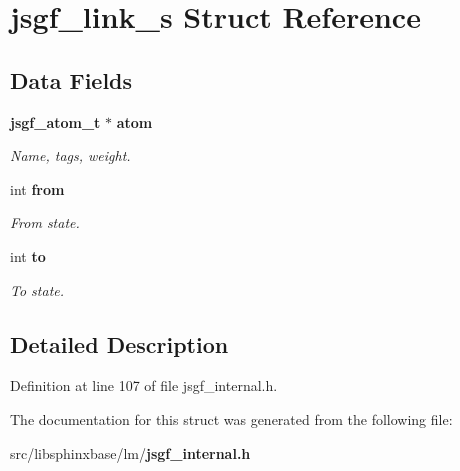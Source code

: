 \section{jsgf\-\_\-link\-\_\-s Struct Reference}
\label{structjsgf__link__s}
\subsection*{Data Fields}
\begin{DoxyCompactItemize}
\item 
{\bf jsgf\-\_\-atom\-\_\-t} $\ast$ {\bf atom}\label{structjsgf__link__s_a140a7cfbe76100928b9c7ea052435ca5}

\begin{DoxyCompactList}\small\item\em Name, tags, weight. \end{DoxyCompactList}\item 
int {\bf from}\label{structjsgf__link__s_a02f9b2bc3b98e802164e80d051923bb3}

\begin{DoxyCompactList}\small\item\em From state. \end{DoxyCompactList}\item 
int {\bf to}\label{structjsgf__link__s_a9da8ad9d87149f0cfca6ca815c581717}

\begin{DoxyCompactList}\small\item\em To state. \end{DoxyCompactList}\end{DoxyCompactItemize}


\subsection{Detailed Description}


Definition at line 107 of file jsgf\-\_\-internal.\-h.



The documentation for this struct was generated from the following file\-:\begin{DoxyCompactItemize}
\item 
src/libsphinxbase/lm/{\bf jsgf\-\_\-internal.\-h}\end{DoxyCompactItemize}
